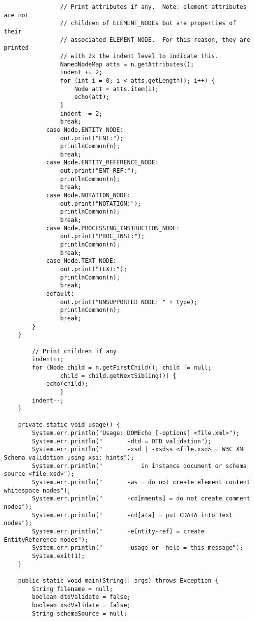 \documentclass[11pt,english]{article}
\begin{document}
\begin{enumerate}
\begin{lstlisting}
                // Print attributes if any.  Note: element attributes are not
                // children of ELEMENT_NODEs but are properties of their
                // associated ELEMENT_NODE.  For this reason, they are printed
                // with 2x the indent level to indicate this.
                NamedNodeMap atts = n.getAttributes();
                indent += 2;
                for (int i = 0; i < atts.getLength(); i++) {
                    Node att = atts.item(i);
                    echo(att);
                }
                indent -= 2;
                break;
            case Node.ENTITY_NODE:
                out.print("ENT:");
                printlnCommon(n);
                break;
            case Node.ENTITY_REFERENCE_NODE:
                out.print("ENT_REF:");
                printlnCommon(n);
                break;
            case Node.NOTATION_NODE:
                out.print("NOTATION:");
                printlnCommon(n);
                break;
            case Node.PROCESSING_INSTRUCTION_NODE:
                out.print("PROC_INST:");
                printlnCommon(n);
                break;
            case Node.TEXT_NODE:
                out.print("TEXT:");
                printlnCommon(n);
                break;
            default:
                out.print("UNSUPPORTED NODE: " + type);
                printlnCommon(n);
                break;
        }
    }

        // Print children if any
        indent++;
        for (Node child = n.getFirstChild(); child != null;
                child = child.getNextSibling()) {
            echo(child);
                }
        indent--;
    }

    private static void usage() {
        System.err.println("Usage: DOMEcho [-options] <file.xml>");
        System.err.println("       -dtd = DTD validation");
        System.err.println("       -xsd | -xsdss <file.xsd> = W3C XML Schema validation using xsi: hints");
        System.err.println("           in instance document or schema source <file.xsd>");
        System.err.println("       -ws = do not create element content whitespace nodes");
        System.err.println("       -co[mments] = do not create comment nodes");
        System.err.println("       -cd[ata] = put CDATA into Text nodes");
        System.err.println("       -e[ntity-ref] = create EntityReference nodes");
        System.err.println("       -usage or -help = this message");
        System.exit(1);
    }

    public static void main(String[] args) throws Exception {
        String filename = null;
        boolean dtdValidate = false;
        boolean xsdValidate = false;
        String schemaSource = null;


\end{lstlisting}
\end{enumerate}
\end{document}
